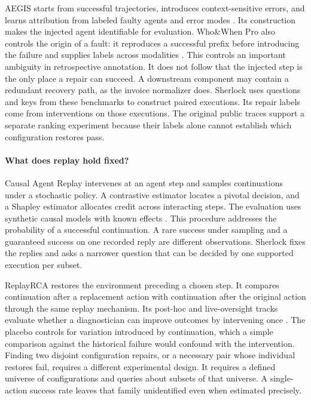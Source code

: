 \documentclass[11pt,letterpaper]{article}
\begin{document}
AEGIS starts from successful trajectories, introduces context-sensitive errors, and learns attribution from labeled faulty agents and error modes \cite{aegis}. Its construction makes the injected agent identifiable for evaluation. Who\&When Pro also controls the origin of a fault: it reproduces a successful prefix before introducing the failure and supplies labels across modalities \cite{pro}. This controls an important ambiguity in retrospective annotation. It does not follow that the injected step is the only place a repair can succeed. A downstream component may contain a redundant recovery path, as the invoice normalizer does. Sherlock uses questions and keys from these benchmarks to construct paired executions. Its repair labels come from interventions on those executions. The original public traces support a separate ranking experiment because their labels alone cannot establish which configuration restores pass.

\paragraph{What does replay hold fixed?}
Causal Agent Replay intervenes at an agent step and samples continuations under a stochastic policy. A contrastive estimator locates a pivotal decision, and a Shapley estimator allocates credit across interacting steps. The evaluation uses synthetic causal models with known effects \cite{shah}. This procedure addresses the probability of a successful continuation. A rare success under sampling and a guaranteed success on one recorded reply are different observations. Sherlock fixes the replies and asks a narrower question that can be decided by one supported execution per subset.

ReplayRCA restores the environment preceding a chosen step. It compares continuation after a replacement action with continuation after the original action through the same replay mechanism. Its post-hoc and live-oversight tracks evaluate whether a diagnostician can improve outcomes by intervening once \cite{replayrca}. The placebo controls for variation introduced by continuation, which a simple comparison against the historical failure would confound with the intervention. Finding two disjoint configuration repairs, or a necessary pair whose individual restores fail, requires a different experimental design. It requires a defined universe of configurations and queries about subsets of that universe. A single-action success rate leaves that family unidentified even when estimated precisely.
\end{document}
